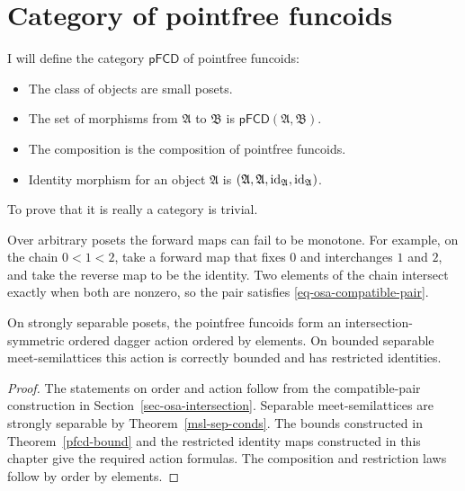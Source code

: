 \section{Category of pointfree funcoids}

I will define the category
$\mathsf{pFCD}$ of pointfree funcoids:
\begin{itemize}
\item The class of objects are small posets.
\item The set of morphisms from $\mathfrak{A}$ to $\mathfrak{B}$ is $\mathsf{pFCD}(\mathfrak{A},\mathfrak{B})$.
\item The composition is the composition of pointfree funcoids.
\item Identity morphism for an object $\mathfrak{A}$ is $(\mathfrak{A},\mathfrak{A},{\operatorname{id}}_{\mathfrak{A}},{\operatorname{id}}_{\mathfrak{A}})$.
\end{itemize}
To prove that it is really a category is trivial.

Over arbitrary posets the forward maps can fail to be monotone.
For example, on the chain $0<1<2$, take a forward map that fixes
$0$ and interchanges $1$ and $2$, and take the reverse map to be
the identity. Two elements of the chain intersect exactly when
both are nonzero, so the pair satisfies
\eqref{eq-osa-compatible-pair}.

\begin{prop}\label{prop-pf-osa}
On strongly separable posets, the pointfree funcoids form an
intersection-symmetric ordered dagger action ordered by elements.
On bounded separable meet-semilattices this action is correctly
bounded and has restricted identities.
\end{prop}
\begin{proof}
The statements on order and action follow from the compatible-pair
construction in Section~\ref{sec-osa-intersection}. Separable
meet-semilattices are strongly separable by
Theorem~\ref{msl-sep-conds}. The bounds constructed in
Theorem~\ref{pfcd-bound} and the restricted identity maps constructed
in this chapter give the required action formulas. The composition and
restriction laws follow by order by elements.
\end{proof}

